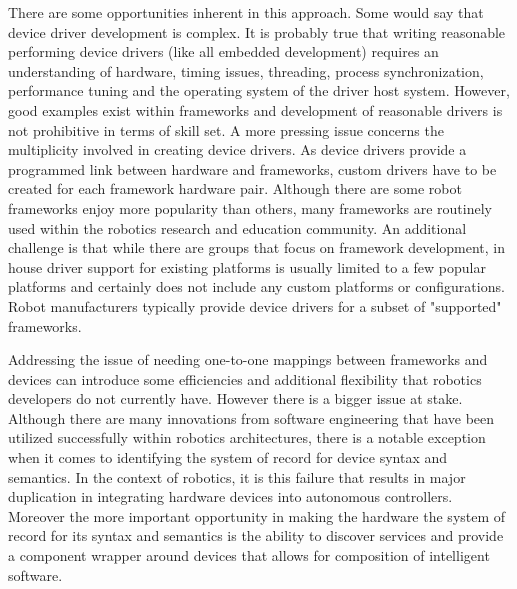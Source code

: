 There are some opportunities inherent in this approach.   Some would say that device driver development is complex.  It is probably true that writing reasonable performing device drivers (like all embedded development) requires an understanding of hardware, timing issues, threading, process synchronization, performance tuning and the operating system of the driver host system.  However, good examples exist within frameworks and development of reasonable drivers is not prohibitive in terms of skill set.   A more pressing issue concerns the multiplicity involved in creating device drivers.  As device drivers provide a programmed link between hardware and frameworks, custom drivers have to be created for each framework hardware pair.  Although there are some robot frameworks enjoy more popularity than others, many frameworks are routinely used within the robotics research and education community.   An additional challenge is that while there are groups that focus on framework development, in house driver support for existing platforms is usually limited to a few popular platforms and certainly does not include any custom platforms or configurations.  Robot manufacturers typically provide device drivers for a subset of "supported" frameworks.

Addressing the issue of needing one-to-one mappings between frameworks and devices can introduce some efficiencies and additional flexibility that robotics developers do not currently have.  However there is a bigger issue at stake.  Although there are many innovations from software engineering that have been utilized successfully within robotics architectures, there is a notable exception when it comes to identifying the system of record for device syntax and semantics.  In the context of robotics, it is this failure that results in major duplication in integrating hardware devices into autonomous controllers.   Moreover the more important opportunity in making the hardware the system of record for its syntax and semantics is the ability to discover services and provide a component wrapper around devices that allows for composition of intelligent software.


